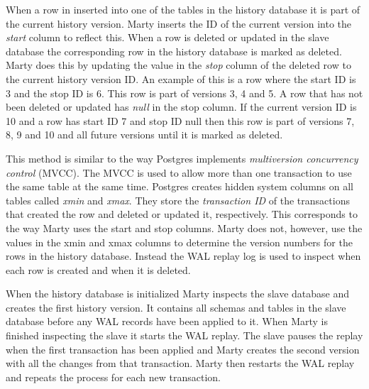 When a row in inserted into one of the tables in the history database it is part of the current history version.
Marty inserts the ID of the current version into the \textit{start} column to reflect this.
When a row is deleted or updated in the slave database the corresponding row in the history database is marked as deleted.
Marty does this by updating the value in the \textit{stop} column of the deleted row to the current history version ID.
An example of this is a row where the start ID is 3 and the stop ID is 6.
This row is part of versions 3, 4 and 5.
A row that has not been deleted or updated has \textit{null} in the stop column.
If the current version ID is 10 and a row has start ID 7 and stop ID null then this row is part of versions 7, 8, 9 and 10 and all future versions until it is marked as deleted.

This method is similar to the way Postgres implements \textit{multiversion concurrency control} (MVCC).
The MVCC is used to allow more than one transaction to use the same table at the same time.
Postgres creates hidden system columns on all tables called \textit{xmin} and \textit{xmax}.
They store the \textit{transaction ID} of the transactions that created the row and deleted or updated it, respectively.
This corresponds to the way Marty uses the start and stop columns.
Marty does not, however, use the values in the xmin and xmax columns to determine the version numbers for the rows in the history database.
Instead the WAL replay log is used to inspect when each row is created and when it is deleted.

When the history database is initialized Marty inspects the slave database and creates the first history version.
It contains all schemas and tables in the slave database before any WAL records have been applied to it.
When Marty is finished inspecting the slave it starts the WAL replay.
The slave pauses the replay when the first transaction has been applied and Marty creates the second version with all the changes from that transaction.
Marty then restarts the WAL replay and repeats the process for each new transaction.